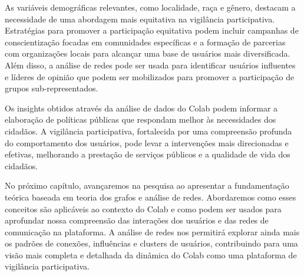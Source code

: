 As variáveis demográficas relevantes, como localidade, raça e gênero, destacam a necessidade de uma abordagem mais equitativa na vigilância participativa. Estratégias para promover a participação equitativa podem incluir campanhas de conscientização focadas em comunidades específicas e a formação de parcerias com organizações locais para alcançar uma base de usuários mais diversificada. Além disso, a análise de redes pode ser usada para identificar usuários influentes e líderes de opinião que podem ser mobilizados para promover a participação de grupos sub-representados.

Os insights obtidos através da análise de dados do Colab podem informar a elaboração de políticas públicas que respondam melhor às necessidades dos cidadãos. A vigilância participativa, fortalecida por uma compreensão profunda do comportamento dos usuários, pode levar a intervenções mais direcionadas e efetivas, melhorando a prestação de serviços públicos e a qualidade de vida dos cidadãos.

No próximo capítulo, avançaremos na pesquisa ao apresentar a fundamentação teórica baseada em teoria dos grafos e análise de redes. Abordaremos como esses conceitos são aplicáveis ao contexto do Colab e como podem ser usados para aprofundar nossa compreensão das interações dos usuários e das redes de comunicação na plataforma. A análise de redes nos permitirá explorar ainda mais os padrões de conexões, influências e clusters de usuários, contribuindo para uma visão mais completa e detalhada da dinâmica do Colab como uma plataforma de vigilância participativa.